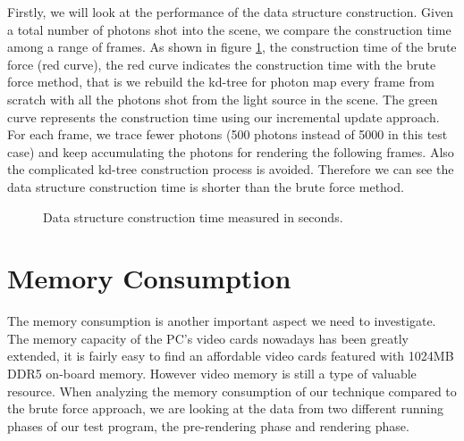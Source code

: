 Firstly, we will look at the performance of the data structure construction. Given a total number of photons shot into the scene, we compare the construction time among a range of frames. As shown in figure \ref{fig:construction_time}, the construction time of the brute force (red curve), the red curve indicates the construction time with the brute force method, that is we rebuild the kd-tree for photon map every frame from scratch with all the photons shot from the light source in the scene. The green curve represents the construction time using our incremental update approach. For each frame, we trace fewer photons (500 photons instead of 5000 in this test case) and keep accumulating the photons for rendering the following frames. Also the complicated kd-tree construction process is avoided. Therefore we can see the data structure construction time is shorter than the brute force method.

\begin{figure}[ftp]
    \centering
    \renewcommand{\thefigure}{\thechapter.\arabic{figure}}
    \caption[Data construction time performance]{Data structure construction time measured in seconds. }
    \label{fig:construction_time}
\end{figure}

\section{Memory Consumption}

The memory consumption is another important aspect we need to investigate. The memory capacity of the PC's video cards nowadays has been greatly extended, it is fairly easy to find an affordable video cards featured with 1024MB DDR5 on-board memory. However video memory is still a type of valuable resource. When analyzing the memory consumption of our technique compared to the brute force approach, we are looking at the data from two different running phases of our test program, the pre-rendering phase and rendering phase.

